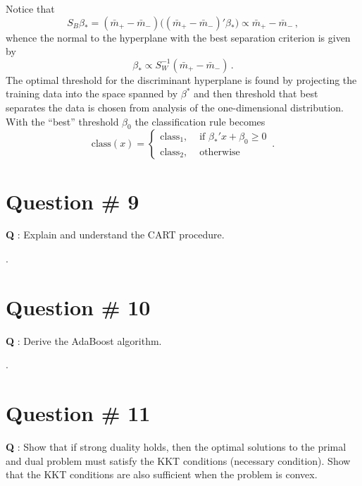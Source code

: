 \documentclass[a4paper]{article}
\begin{document}
Notice that
\[
S_B \beta_* = (\bar{m}_+ - \bar{m}_-) \bigl( (\bar{m}_+ - \bar{m}_-)'\beta_* \bigr)
\propto \bar{m}_+ - \bar{m}_-\,,
\]
whence the normal to the hyperplane with the best separation criterion is given by
\[ \beta_* \propto S_W^{-1} (\bar{m}_+ - \bar{m}_-) \,. \]
The optimal threshold for the discriminant hyperplane is found by projecting the 
training data into the space spanned by $\beta^*$ and then threshold that best
separates the data is chosen from analysis of the one-dimensional distribution.
With the ``best'' threshold $\beta_0$ the classification rule becomes
\[\text{class}(x) = \begin{cases}
	\text{class}_1, &\text{ if } \beta_*' x + \beta_0 \geq 0\\
	\text{class}_2, &\text{ otherwise }
\end{cases}\,.\]

\clearpage

\section{Question \# 9} %
\label{sec:question_9}
\textbf{\large \textbf{Q}} : Explain and understand the CART procedure.

 .\hfill\\

\clearpage

\section{Question \# 10} %
\label{sec:question_10}
\textbf{\large \textbf{Q}} : Derive the AdaBoost algorithm.

 .\hfill\\

\clearpage

\section{Question \# 11} %
\label{sec:question_11}
\textbf{\large \textbf{Q}} : Show that if strong duality holds, then the optimal
solutions to the primal and dual problem must satisfy the KKT conditions (necessary
condition). Show that the KKT conditions are also sufficient when the problem is
convex.
\end{document}
